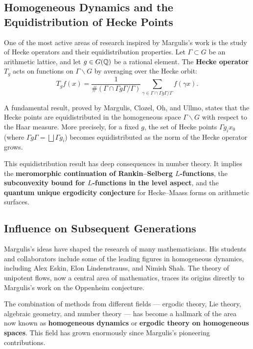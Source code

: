 \subsection{Homogeneous Dynamics and the Equidistribution of Hecke Points}

One of the most active areas of research inspired by Margulis's work is the study of Hecke operators and their equidistribution properties. Let \(\Gamma \subset G\) be an arithmetic lattice, and let \(g \in G(\mathbb{Q})\) be a rational element. The \textbf{Hecke operator} \(T_g\) acts on functions on \(\Gamma \backslash G\) by averaging over the Hecke orbit:
\[
T_g f(x) = \frac{1}{\#(\Gamma \cap \Gamma g \Gamma / \Gamma)} \sum_{\gamma \in \Gamma \cap \Gamma g \Gamma / \Gamma} f(\gamma x).
\]

A fundamental result, proved by Margulis, Clozel, Oh, and Ullmo, states that the Hecke points are equidistributed in the homogeneous space \(\Gamma \backslash G\) with respect to the Haar measure. More precisely, for a fixed \(g\), the set of Hecke points \(\Gamma g_i x_0\) (where \(\Gamma g \Gamma = \bigsqcup \Gamma g_i\)) becomes equidistributed as the norm of the Hecke operator grows.

This equidistribution result has deep consequences in number theory. It implies the \textbf{meromorphic continuation of Rankin--Selberg \(L\)-functions}, the \textbf{subconvexity bound for \(L\)-functions in the level aspect}, and the \textbf{quantum unique ergodicity conjecture} for Hecke--Maass forms on arithmetic surfaces.

\subsection{Influence on Subsequent Generations}

Margulis's ideas have shaped the research of many mathematicians. His students and collaborators include some of the leading figures in homogeneous dynamics, including Alex Eskin, Elon Lindenstrauss, and Nimish Shah. The theory of unipotent flows, now a central area of mathematics, traces its origins directly to Margulis's work on the Oppenheim conjecture.

The combination of methods from different fields --- ergodic theory, Lie theory, algebraic geometry, and number theory --- has become a hallmark of the area now known as \textbf{homogeneous dynamics} or \textbf{ergodic theory on homogeneous spaces}. This field has grown enormously since Margulis's pioneering contributions.

